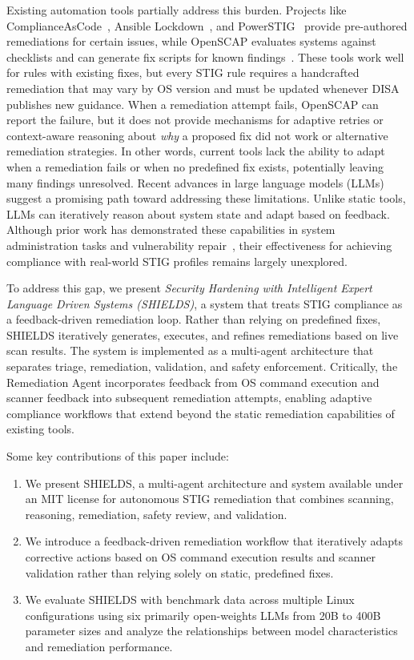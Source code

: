 \documentclass[pdflatex,sn-mathphys-num]{sn-jnl}%
\begin{document}
Existing automation tools partially address this burden. Projects like ComplianceAsCode~\cite{complianceascode}, Ansible Lockdown~\cite{ansiblelockdown}, and PowerSTIG~\cite{powerstig} provide pre-authored remediations for certain issues, while OpenSCAP evaluates systems against checklists and can generate fix scripts for known findings~\cite{redhat_openscap}. These tools work well for rules with existing fixes, but every STIG rule requires a handcrafted remediation that may vary by OS version and must be updated whenever DISA publishes new guidance. When a remediation attempt fails, OpenSCAP can report the failure, but it does not provide mechanisms for adaptive retries or context-aware reasoning about \emph{why} a proposed fix did not work or alternative remediation strategies. In other words, current tools lack the ability to adapt when a remediation fails or when no predefined fix exists, potentially leaving many findings unresolved. Recent advances in large language models (LLMs) suggest a promising path toward addressing these limitations. Unlike static tools, LLMs can iteratively reason about system state and adapt based on feedback. Although prior work has demonstrated these capabilities in system administration tasks and vulnerability repair~\cite{genkubesec,vrpilot,llmpatch,managing}, their effectiveness for achieving compliance with real-world STIG profiles remains largely unexplored.

To address this gap, we present \emph{Security Hardening with Intelligent Expert Language Driven Systems (SHIELDS)}, a system that treats STIG compliance as a feedback-driven remediation loop. Rather than relying on predefined fixes, SHIELDS iteratively generates, executes, and refines remediations based on live scan results. The system is implemented as a multi-agent architecture that separates triage, remediation, validation, and safety enforcement. Critically, the Remediation Agent incorporates feedback from OS command execution and scanner feedback into subsequent remediation attempts, enabling adaptive compliance workflows that extend beyond the static remediation capabilities of existing tools.

Some key contributions of this paper include:
\begin{enumerate}
    \item We present SHIELDS, a multi-agent architecture and system available under an MIT license for autonomous STIG remediation that combines scanning, reasoning, remediation, safety review, and validation.
    \item We introduce a feedback-driven remediation workflow that iteratively adapts corrective actions based on OS command execution results and scanner validation rather than relying solely on static, predefined fixes.
    \item We evaluate SHIELDS with benchmark data across multiple Linux configurations using six primarily open-weights LLMs from 20B to 400B parameter sizes and analyze the relationships between model characteristics and remediation performance.
\end{enumerate}
\end{document}
